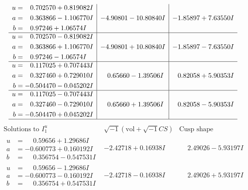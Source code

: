 \documentclass[1p]{elsarticle_modified}
\theoremstyle{definition}
\newcommand{\I}{\sqrt{-1}}
\begin{document}
$$\begin{array}{c|c|c}
\begin{aligned}
u &= \phantom{-}0.702570 + 0.819082 I \\
a &= \phantom{-}0.363866 - 1.106770 I \\
b &= \phantom{-}0.97246 + 1.06574 I\end{aligned}
 & -4.90801 - 10.80840 I & -1.85897 + 7.63550 I \\ \hline\begin{aligned}
u &= \phantom{-}0.702570 - 0.819082 I \\
a &= \phantom{-}0.363866 + 1.106770 I \\
b &= \phantom{-}0.97246 - 1.06574 I\end{aligned}
 & -4.90801 + 10.80840 I & -1.85897 - 7.63550 I \\ \hline\begin{aligned}
u &= \phantom{-}0.117025 + 0.707443 I \\
a &= \phantom{-}0.327460 + 0.729010 I \\
b &= -0.504470 - 0.045202 I\end{aligned}
 & \phantom{-}0.65660 - 1.39506 I & \phantom{-}0.82058 + 5.90353 I \\ \hline\begin{aligned}
u &= \phantom{-}0.117025 - 0.707443 I \\
a &= \phantom{-}0.327460 - 0.729010 I \\
b &= -0.504470 + 0.045202 I\end{aligned}
 & \phantom{-}0.65660 + 1.39506 I & \phantom{-}0.82058 - 5.90353 I\\
 \hline 
 \end{array}$$\newpage$$\begin{array}{c|c|c}  
\text{Solutions to }I^u_{1}& \I (\text{vol} + \sqrt{-1}CS) & \text{Cusp shape}\\
 \hline 
\begin{aligned}
u &= \phantom{-}0.59656 + 1.29686 I \\
a &= -0.600773 + 0.160192 I \\
b &= \phantom{-}0.356754 - 0.547531 I\end{aligned}
 & -2.42718 + 0.16938 I & \phantom{-}2.49026 - 5.93197 I \\ \hline\begin{aligned}
u &= \phantom{-}0.59656 - 1.29686 I \\
a &= -0.600773 - 0.160192 I \\
b &= \phantom{-}0.356754 + 0.547531 I\end{aligned}
 & -2.42718 - 0.16938 I & \phantom{-}2.49026 + 5.93197 I \\ \hline\begin{aligned}

\end{aligned}
\end{array}$$
\end{document}
